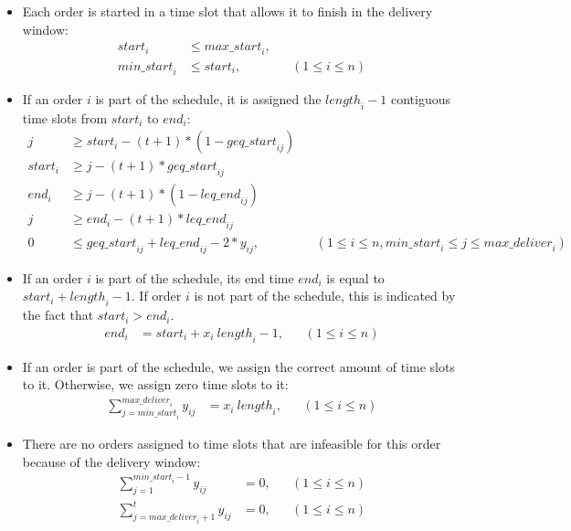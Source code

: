 \documentclass{article}
\begin{document}
\begin{itemize}
    \item Each order is started in a time slot that allows it to finish in the delivery window:
    \begin{align}
    \mathit{start}_i &\leq \mathit{max\_start}_i, \\
    \mathit{min\_start}_i &\leq \mathit{start}_i, &&(1 \leq i \leq n)	
    \end{align}
    
    \item If an order $i$ is part of the schedule, it is assigned the $\mathit{length}_i - 1$ contiguous time slots from $\mathit{start}_i$ to $\mathit{end}_i$:
    \begin{align}
      j &\geq \mathit{start}_i - (t+1) * (1-\mathit{geq\_start}_{ij}) \\
      \mathit{start}_i &\geq j - (t+1) * \mathit{geq\_start}_{ij} \\
      \mathit{end}_i &\geq j - (t+1) * (1-\mathit{leq\_end}_{ij}) \\
      j &\geq \mathit{end}_i - (t+1) * \mathit{leq\_end}_{ij} \\
      0 &\leq \mathit{geq\_start}_{ij} + \mathit{leq\_end}_{ij} - 2 * y_{ij}, &&(1 \leq i \leq n, \mathit{min\_start}_i \leq j \leq \mathit{max\_deliver}_i) 
   \end{align}

    \item If an order $i$ is part of the schedule, its end time $\mathit{end}_i$ is equal to $\mathit{start}_i + \mathit{length}_i - 1$. 
      If order $i$ is not part of the schedule, this is indicated by the fact that $\mathit{start}_i > \mathit{end}_i$.
    \begin{align}
        \mathit{end}_i &= \mathit{start}_i + x_i \: \mathit{length}_i - 1, &&(1 \leq i \leq n)
    \end{align}

     \item %
     If an order is part of the schedule, we assign the correct amount of time slots to it.
     Otherwise, we assign zero time slots to it:    
    \begin{align}
        \sum^{\mathit{max\_deliver}_i}_{j = \mathit{min\_start}_i} y_{ij} &= x_i \: \mathit{length}_i, &&(1 \leq i \leq n)
    \end{align}
    
    \item There are no orders assigned to time slots that are infeasible for this order because of the delivery window:    
    \begin{align}
        \sum_{j = 1}^{\mathit{min\_start}_i-1} y_{ij} &= 0, &&(1 \leq i \leq n) \\
        \sum_{j = \mathit{max\_deliver}_i+1}^t y_{ij} &= 0, &&(1 \leq i \leq n) 
    \end{align}
\end{itemize}
\end{document}
